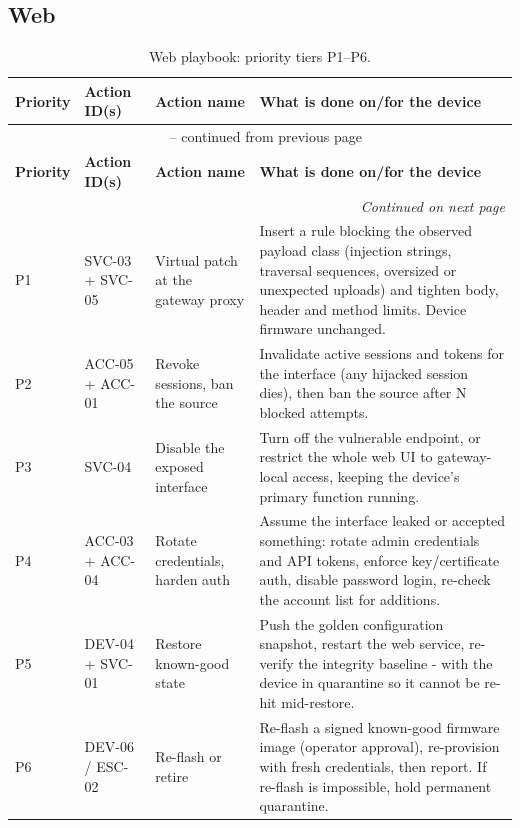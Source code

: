 \subsection{Web}

\begin{longtable}{|p{}|p{}|p{}|p{}|}
\caption{Web playbook: priority tiers P1--P6.}
\label{tab:playbook_web}\\
\hline
\textbf{Priority} & \textbf{Action ID(s)} & \textbf{Action name} & \textbf{What is done on/for the device} \\
\hline
\endfirsthead
\multicolumn{4}{c}{\tablename\ \thetable{} -- continued from previous page}\\
\hline
\textbf{Priority} & \textbf{Action ID(s)} & \textbf{Action name} & \textbf{What is done on/for the device} \\
\hline
\endhead
\hline \multicolumn{4}{r}{\textit{Continued on next page}}\\
\endfoot
\hline
\endlastfoot
P1 & SVC-03 + SVC-05 & Virtual patch at the gateway proxy & Insert a rule blocking the observed payload class (injection strings, traversal sequences, oversized or unexpected uploads) and tighten body, header and method limits. Device firmware unchanged. \\
\hline
P2 & ACC-05 + ACC-01 & Revoke sessions, ban the source & Invalidate active sessions and tokens for the interface (any hijacked session dies), then ban the source after N blocked attempts. \\
\hline
P3 & SVC-04 & Disable the exposed interface & Turn off the vulnerable endpoint, or restrict the whole web UI to gateway-local access, keeping the device's primary function running. \\
\hline
P4 & ACC-03 + ACC-04 & Rotate credentials, harden auth & Assume the interface leaked or accepted something: rotate admin credentials and API tokens, enforce key/certificate auth, disable password login, re-check the account list for additions. \\
\hline
P5 & DEV-04 + SVC-01 & Restore known-good state & Push the golden configuration snapshot, restart the web service, re-verify the integrity baseline - with the device in quarantine so it cannot be re-hit mid-restore. \\
\hline
P6 & DEV-06 / ESC-02 & Re-flash or retire & Re-flash a signed known-good firmware image (operator approval), re-provision with fresh credentials, then report. If re-flash is impossible, hold permanent quarantine. \\
\hline
\end{longtable}

